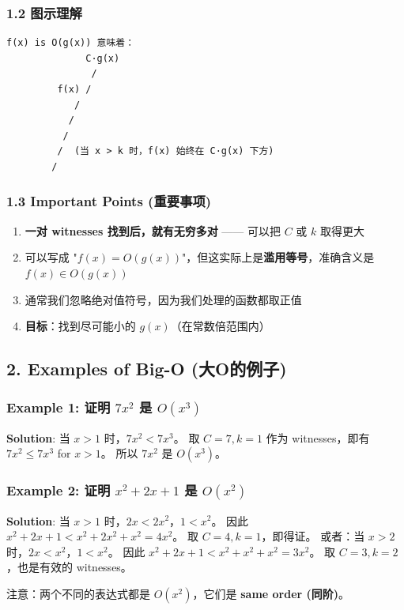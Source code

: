 \documentclass[10pt,a4paper,openany]{ctexbook}
\theoremstyle{definition}
\theoremstyle{remark}
\renewenvironment{quote}
  {\list{}{\leftmargin=1em\rightmargin=0pt\topsep=0.5pt\partopsep=0pt}\item[]}
  {\endlist}
\begin{document}
\subsubsection{1.2 图示理解}

{\footnotesize\begin{verbatim}
f(x) is O(g(x)) 意味着：
              C·g(x)
               /
         f(x) /
            /
           /  
          /
         /  (当 x > k 时，f(x) 始终在 C·g(x) 下方)
        /
\end{verbatim}}

\subsubsection{1.3 Important Points (重要事项)}

\begin{enumerate}
\item \textbf{一对 witnesses 找到后，就有无穷多对} —— 可以把 $C$ 或 $k$ 取得更大
\item 可以写成 "$f(x) = O(g(x))$"，但这实际上是\textbf{滥用等号}，准确含义是 $f(x) \in O(g(x))$
\item 通常我们忽略绝对值符号，因为我们处理的函数都取正值
\item \textbf{目标}：找到尽可能小的 $g(x)$（在常数倍范围内）

\end{enumerate}

\vspace{-2pt}

\subsection{2. Examples of Big-O (大O的例子)}

\subsubsection{Example 1: 证明 $7x^2$ 是 $O(x^3)$}

\textbf{Solution}:
当 $x > 1$ 时，$7x^2 < 7x^3$。
取 $C = 7, k = 1$ 作为 witnesses，即有 $7x^2 \leq 7x^3$ for $x > 1$。
所以 $7x^2$ 是 $O(x^3)$。
\subsubsection{Example 2: 证明 $x^2 + 2x + 1$ 是 $O(x^2)$}

\textbf{Solution}:
当 $x > 1$ 时，$2x < 2x^2$，$1 < x^2$。
因此 $x^2 + 2x + 1 < x^2 + 2x^2 + x^2 = 4x^2$。
取 $C = 4, k = 1$，即得证。
或者：当 $x > 2$ 时，$2x < x^2$，$1 < x^2$。
因此 $x^2 + 2x + 1 < x^2 + x^2 + x^2 = 3x^2$。
取 $C = 3, k = 2$，也是有效的 witnesses。
\begin{quote}
注意：两个不同的表达式都是 $O(x^2)$，它们是 \textbf{same order (同阶)}。

\end{quote}
\end{document}
